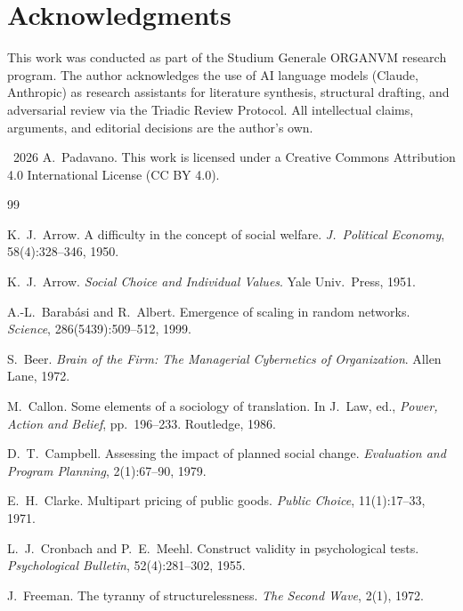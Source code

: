 \documentclass[12pt,a4paper]{article}
\begin{document}
\section*{Acknowledgments}

This work was conducted as part of the Studium Generale ORGANVM research
program. The author acknowledges the use of AI language models (Claude,
Anthropic) as research assistants for literature synthesis, structural
drafting, and adversarial review via the Triadic Review Protocol. All
intellectual claims, arguments, and editorial decisions are the author's own.

\medskip
\noindent\textcopyright~2026 A.~Padavano. This work is licensed under a
Creative Commons Attribution 4.0 International License (CC BY 4.0).

\begin{thebibliography}{99}

K.~J.~Arrow.
\newblock A difficulty in the concept of social welfare.
\newblock \emph{J.\ Political Economy}, 58(4):328--346, 1950.

K.~J.~Arrow.
\newblock \emph{Social Choice and Individual Values}.
\newblock Yale Univ.\ Press, 1951.

A.-L.~Barab\'{a}si and R.~Albert.
\newblock Emergence of scaling in random networks.
\newblock \emph{Science}, 286(5439):509--512, 1999.

S.~Beer.
\newblock \emph{Brain of the Firm: The Managerial Cybernetics of Organization}.
\newblock Allen Lane, 1972.

M.~Callon.
\newblock Some elements of a sociology of translation.
\newblock In J.~Law, ed., \emph{Power, Action and Belief}, pp.~196--233. Routledge, 1986.

D.~T.~Campbell.
\newblock Assessing the impact of planned social change.
\newblock \emph{Evaluation and Program Planning}, 2(1):67--90, 1979.

E.~H.~Clarke.
\newblock Multipart pricing of public goods.
\newblock \emph{Public Choice}, 11(1):17--33, 1971.

L.~J.~Cronbach and P.~E.~Meehl.
\newblock Construct validity in psychological tests.
\newblock \emph{Psychological Bulletin}, 52(4):281--302, 1955.

J.~Freeman.
\newblock The tyranny of structurelessness.
\newblock \emph{The Second Wave}, 2(1), 1972.


\end{thebibliography}
\end{document}
